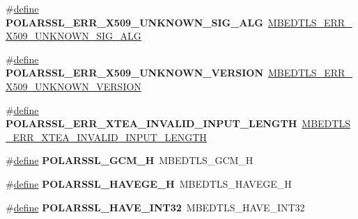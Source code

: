 \begin{DoxyCompactItemize}
\item 
\mbox{\label{compat-1_83_8h_a87606217fba12ea921df66f51ad8c2e9}} 
\#\hyperlink{structdefine}{define} {\bfseries P\+O\+L\+A\+R\+S\+S\+L\+\_\+\+E\+R\+R\+\_\+\+X509\+\_\+\+U\+N\+K\+N\+O\+W\+N\+\_\+\+S\+I\+G\+\_\+\+A\+LG}~\hyperlink{group__x509__module_ga488f8616b42eae6fe3fb9815d43c976f}{M\+B\+E\+D\+T\+L\+S\+\_\+\+E\+R\+R\+\_\+\+X509\+\_\+\+U\+N\+K\+N\+O\+W\+N\+\_\+\+S\+I\+G\+\_\+\+A\+LG}
\item 
\mbox{\label{compat-1_83_8h_a04dc192b55781ef24910bd1dfa53e6f3}} 
\#\hyperlink{structdefine}{define} {\bfseries P\+O\+L\+A\+R\+S\+S\+L\+\_\+\+E\+R\+R\+\_\+\+X509\+\_\+\+U\+N\+K\+N\+O\+W\+N\+\_\+\+V\+E\+R\+S\+I\+ON}~\hyperlink{group__x509__module_gab80a4eb806328731def21ec2ebcbc365}{M\+B\+E\+D\+T\+L\+S\+\_\+\+E\+R\+R\+\_\+\+X509\+\_\+\+U\+N\+K\+N\+O\+W\+N\+\_\+\+V\+E\+R\+S\+I\+ON}
\item 
\mbox{\label{compat-1_83_8h_a9c09eafcc6b5bacc7d3617daaf357727}} 
\#\hyperlink{structdefine}{define} {\bfseries P\+O\+L\+A\+R\+S\+S\+L\+\_\+\+E\+R\+R\+\_\+\+X\+T\+E\+A\+\_\+\+I\+N\+V\+A\+L\+I\+D\+\_\+\+I\+N\+P\+U\+T\+\_\+\+L\+E\+N\+G\+TH}~\hyperlink{xtea_8h_addf91fc82370cb27115b725ceb261b3d}{M\+B\+E\+D\+T\+L\+S\+\_\+\+E\+R\+R\+\_\+\+X\+T\+E\+A\+\_\+\+I\+N\+V\+A\+L\+I\+D\+\_\+\+I\+N\+P\+U\+T\+\_\+\+L\+E\+N\+G\+TH}
\item 
\mbox{\label{compat-1_83_8h_a9f26a56af1554d78af1974bde5b84dcb}} 
\#\hyperlink{structdefine}{define} {\bfseries P\+O\+L\+A\+R\+S\+S\+L\+\_\+\+G\+C\+M\+\_\+H}~M\+B\+E\+D\+T\+L\+S\+\_\+\+G\+C\+M\+\_\+H
\item 
\mbox{\label{compat-1_83_8h_a85a5b3d991d311ca52fae1edd9ea60db}} 
\#\hyperlink{structdefine}{define} {\bfseries P\+O\+L\+A\+R\+S\+S\+L\+\_\+\+H\+A\+V\+E\+G\+E\+\_\+H}~M\+B\+E\+D\+T\+L\+S\+\_\+\+H\+A\+V\+E\+G\+E\+\_\+H
\item 
\mbox{\label{compat-1_83_8h_aaa32170d1fc407e0be9ddbce62871c74}} 
\#\hyperlink{structdefine}{define} {\bfseries P\+O\+L\+A\+R\+S\+S\+L\+\_\+\+H\+A\+V\+E\+\_\+\+I\+N\+T32}~M\+B\+E\+D\+T\+L\+S\+\_\+\+H\+A\+V\+E\+\_\+\+I\+N\+T32
\item 
\mbox{\label{compat-1_83_8h_a46172cc109d3f61ecda014599756e020}} 

\end{DoxyCompactItemize}
